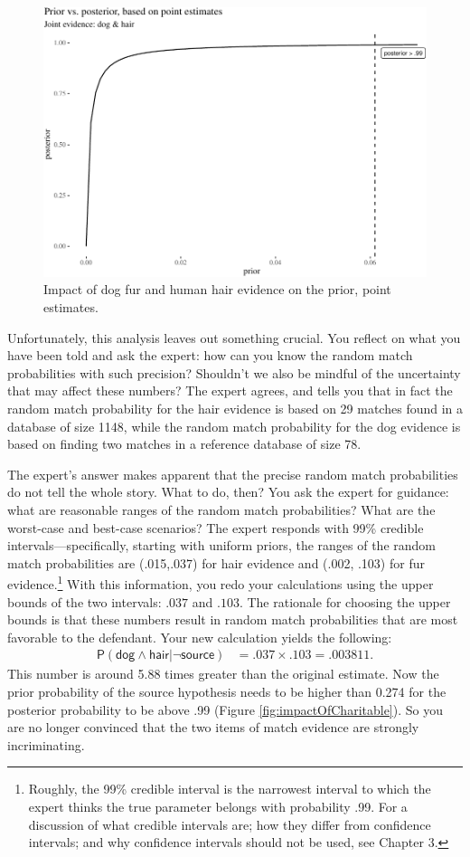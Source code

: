 \documentclass[
  10pt,
  dvipsnames,enabledeprecatedfontcommands]{scrartcl}
\newcommand{\s}[1]{\mbox{$\mathsf{#1}$}}
\begin{document}
\begin{figure}[H]

\begin{center}\includegraphics[width=0.6\linewidth]{chapter-outline_files/figure-latex/impactOfPoint4-1} \end{center}
\caption{Impact of dog fur and human hair evidence on the prior, point estimates.}
\label{fig:impactOfPoint}
\end{figure}

Unfortunately, this analysis leaves out something crucial. You reflect
on what you have been told and ask the expert: how can you know the
random match probabilities with such precision? Shouldn't we also be
mindful of the uncertainty that may affect these numbers? The expert
agrees, and tells you that in fact the random match probability for the
hair evidence is based on 29 matches found in a database of size 1148,
while the random match probability for the dog evidence is based on
finding two matches in a reference database of size 78.

The expert's answer makes apparent that the precise random match
probabilities do not tell the whole story. What to do, then? You ask the
expert for guidance: what are reasonable ranges of the random match
probabilities? What are the worst-case and best-case scenarios? The
expert responds with 99\% credible intervals---specifically, starting
with uniform priors, the ranges of the random match probabilities are
(.015,.037) for hair evidence and (.002, .103) for fur
evidence.\footnote{Roughly, the 99\% credible interval is the narrowest
  interval to which the expert thinks the true parameter belongs with
  probability .99. For a discussion of what credible intervals are; how
  they differ from confidence intervals; and why confidence intervals
  should not be used, see Chapter 3.} With this information, you redo
your calculations using the upper bounds of the two intervals: \(.037\)
and \(.103\). The rationale for choosing the upper bounds is that these
numbers result in random match probabilities that are most favorable to
the defendant. Your new calculation yields the following: \begin{align*}
\mathsf{P}(\s{dog}\wedge \s{hair} \vert \neg \s{source})   & =  .037 \times .103 =.003811.
\end{align*} This number is around 5.88 times greater than the original
estimate. Now the prior probability of the source hypothesis needs to be
higher than 0.274 for the posterior probability to be above .99 (Figure
\ref{fig:impactOfCharitable}). So you are no longer convinced that the
two items of match evidence are strongly incriminating.
\end{document}
